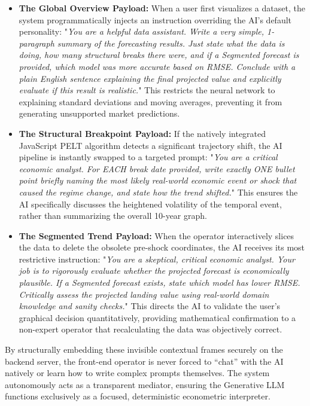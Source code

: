 \begin{itemize}
    \item \textbf{The Global Overview Payload:} When a user first visualizes a dataset, the system programmatically injects an instruction overriding the AI's default personality: "\textit{You are a helpful data assistant. Write a very simple, 1-paragraph summary of the forecasting results. Just state what the data is doing, how many structural breaks there were, and if a Segmented forecast is provided, which model was more accurate based on RMSE. Conclude with a plain English sentence explaining the final projected value and explicitly evaluate if this result is realistic.}" This restricts the neural network to explaining standard deviations and moving averages, preventing it from generating unsupported market predictions.
    
    \item \textbf{The Structural Breakpoint Payload:} If the natively integrated JavaScript PELT algorithm detects a significant trajectory shift, the AI pipeline is instantly swapped to a targeted prompt: "\textit{You are a critical economic analyst. For EACH break date provided, write exactly ONE bullet point briefly naming the most likely real-world economic event or shock that caused the regime change, and state how the trend shifted.}" This ensures the AI specifically discusses the heightened volatility of the temporal event, rather than summarizing the overall 10-year graph.
    
    \item \textbf{The Segmented Trend Payload:} When the operator interactively slices the data to delete the obsolete pre-shock coordinates, the AI receives its most restrictive instruction: "\textit{You are a skeptical, critical economic analyst. Your job is to rigorously evaluate whether the projected forecast is economically plausible. If a Segmented forecast exists, state which model has lower RMSE. Critically assess the projected landing value using real-world domain knowledge and sanity checks.}" This directs the AI to validate the user's graphical decision quantitatively, providing mathematical confirmation to a non-expert operator that recalculating the data was objectively correct.
\end{itemize}

By structurally embedding these invisible contextual frames securely on the backend server, the front-end operator is never forced to ``chat'' with the AI natively or learn how to write complex prompts themselves. The system autonomously acts as a transparent mediator, ensuring the Generative LLM functions exclusively as a focused, deterministic econometric interpreter.

